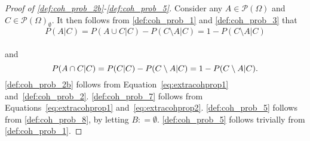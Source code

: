 \documentclass[10pt]{paper}
\theoremstyle{definition}
\newtheorem{lemma}[theorem]{Lemma}
\newcommand{\reals}{\mathbb{R}}
\newcommand{\paths}{\Omega}
\newcommand{\power}{\mathcal{P}(\paths)}
\newcommand{\nonemptypower}{\power_{\emptyset}}
\newcommand{\coloneqq}{:\!=}
\begin{document}
\begin{proof}[Proof of \ref{def:coh_prob_2b}-\ref{def:coh_prob_5}]
Consider any $A\in\power$ and $C\in\nonemptypower$. It then follows from \ref{def:coh_prob_1} and \ref{def:coh_prob_3} that
\vspace{-7pt}
\begin{equation}\label{eq:extracohprop1}
P(A\vert C)
=P(A\cup C\vert C)-P(C\setminus A\vert C)
=1-P(C\setminus A\vert C)
\end{equation}\\[-20pt]
and
\begin{equation}\label{eq:extracohprop2}
P(A\cap C\vert C)
=P(C\vert C)-P(C\setminus A\vert C)
=1-P(C\setminus A\vert C).
\vspace{6pt}
\end{equation}
\ref{def:coh_prob_2b} follows from Equation~\eqref{eq:extracohprop1} and~\ref{def:coh_prob_2}. \ref{def:coh_prob_7} follows from Equations~\eqref{eq:extracohprop1} and~\eqref{eq:extracohprop2}. \ref{def:coh_prob_5} follows from \ref{def:coh_prob_8}, by letting $B\coloneqq\emptyset$. \ref{def:coh_prob_5} follows trivially from \ref{def:coh_prob_1}.
\end{proof}



\end{document}
